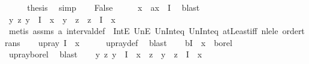 \begin{isabellebody}
\ \ \isamarkupfalse%
\ \isamarkupfalse%
\ {\isacharquery}{\kern0pt}thesis\ \isamarkupfalse%
\ simp\isanewline
{}\isamarkupfalse%
\isanewline
\ \ \isamarkupfalse%
\ False\isanewline
\ \ \isamarkupfalse%
\ \isamarkupfalse%
\ x\ \ a{\isacharcolon}{\kern0pt}{\isachardoublequoteopen}x\ {\isasymin}\ I{\isachardoublequoteclose}\ \isamarkupfalse%
\ blast\isanewline
\ \ \isamarkupfalse%
\ {\isachardoublequoteopen}{\isasymAnd}y\ z{\isachardot}{\kern0pt}\ y\ {\isasymin}\ I\ {\isasymunion}\ {\isacharbraceleft}{\kern0pt}x{\isachardot}{\kern0pt}{\isachardot}{\kern0pt}{\isacharbraceright}{\kern0pt}\ {\isasymLongrightarrow}\ y\ {\isasymle}\ z\ {\isasymLongrightarrow}\ z\ {\isasymin}\ I\ {\isasymunion}\ {\isacharbraceleft}{\kern0pt}x{\isachardot}{\kern0pt}{\isachardot}{\kern0pt}{\isacharbraceright}{\kern0pt}{\isachardoublequoteclose}\ \isanewline
\ \ \ \ \isamarkupfalse%
\ {\isacharparenleft}{\kern0pt}metis\ assms\ a\ interval{\isacharunderscore}{\kern0pt}def\ \ IntE\ UnE\ Un{\isacharunderscore}{\kern0pt}Int{\isacharunderscore}{\kern0pt}eq{\isacharparenleft}{\kern0pt}{}{\isacharparenright}{\kern0pt}\ Un{\isacharunderscore}{\kern0pt}Int{\isacharunderscore}{\kern0pt}eq{\isacharparenleft}{\kern0pt}{}{\isacharparenright}{\kern0pt}\ atLeast{\isacharunderscore}{\kern0pt}iff\ nle{\isacharunderscore}{\kern0pt}le\ order{\isachardot}{\kern0pt}trans{\isacharparenright}{\kern0pt}\isanewline
\ \ \isamarkupfalse%
\ {\isachardoublequoteopen}up{\isacharunderscore}{\kern0pt}ray\ {\isacharparenleft}{\kern0pt}I\ {\isasymunion}\ {\isacharbraceleft}{\kern0pt}x{\isachardot}{\kern0pt}{\isachardot}{\kern0pt}{\isacharbraceright}{\kern0pt}{\isacharparenright}{\kern0pt}{\isachardoublequoteclose}\isanewline
\ \ \ \ \isamarkupfalse%
\ up{\isacharunderscore}{\kern0pt}ray{\isacharunderscore}{\kern0pt}def\ \isamarkupfalse%
\ blast\isanewline
\ \ \isamarkupfalse%
\ b{\isacharcolon}{\kern0pt}{\isachardoublequoteopen}I\ {\isasymunion}\ {\isacharbraceleft}{\kern0pt}x{\isachardot}{\kern0pt}{\isachardot}{\kern0pt}{\isacharbraceright}{\kern0pt}\ {\isasymin}\ borel{\isachardoublequoteclose}\ \isanewline
\ \ \ \ \isamarkupfalse%
\ up{\isacharunderscore}{\kern0pt}ray{\isacharunderscore}{\kern0pt}borel\ \isamarkupfalse%
\ blast\isanewline
\isanewline
\ \ \isamarkupfalse%
\ {\isachardoublequoteopen}{\isasymAnd}y\ z{\isachardot}{\kern0pt}\ y\ {\isasymin}\ I\ {\isasymunion}\ {\isacharbraceleft}{\kern0pt}{\isachardot}{\kern0pt}{\isachardot}{\kern0pt}x{\isacharbraceright}{\kern0pt}\ {\isasymLongrightarrow}\ z\ {\isasymle}\ y\ {\isasymLongrightarrow}\ z\ {\isasymin}\ I\ {\isasymunion}\ {\isacharbraceleft}{\kern0pt}{\isachardot}{\kern0pt}{\isachardot}{\kern0pt}x{\isacharbraceright}{\kern0pt}{\isachardoublequoteclose}\ \isanewline

\end{isabellebody}
